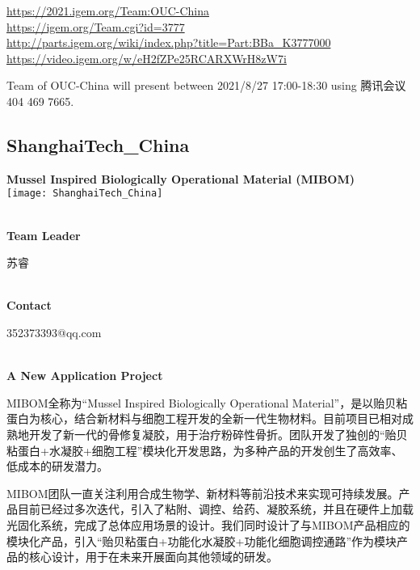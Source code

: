 \url{https://2021.igem.org/Team:OUC-China }\\
\url{https://igem.org/Team.cgi?id=3777 }\\
\url{http://parts.igem.org/wiki/index.php?title=Part:BBa_K3777000 }\\
\url{https://video.igem.org/w/eH2fZPe25RCARXWrH8zW7i }\\

\vfill{}









Team of OUC-China will present between   2021/8/27 17:00-18:30      using 腾讯会议 404 469 7665.
\newpage


\subsection{\textcolor{Blu}{ ShanghaiTech\_China } }
\vspace{5mm}
\begin{center}
\large{
  \textbf{ Mussel Inspired Biologically Operational Material (MIBOM) }\\

  \texttt{[image: ShanghaiTech\_China]}
}
\end{center}
\textbf{\\Team Leader}

  苏睿


\textbf{\\Contact}

  352373393@qq.com


\textbf{\\A New Application Project\\}\begin{spacing}{1.5}

MIBOM全称为“Mussel Inspired Biologically Operational Material”，是以贻贝粘蛋白为核心，结合新材料与细胞工程开发的全新一代生物材料。目前项目已相对成熟地开发了新一代的骨修复凝胶，用于治疗粉碎性骨折。团队开发了独创的“贻贝粘蛋白+水凝胶+细胞工程”模块化开发思路，为多种产品的开发创生了高效率、低成本的研发潜力。

MIBOM团队一直关注利用合成生物学、新材料等前沿技术来实现可持续发展。产品目前已经过多次迭代，引入了粘附、调控、给药、凝胶系统，并且在硬件上加载光固化系统，完成了总体应用场景的设计。我们同时设计了与MIBOM产品相应的模块化产品，引入“贻贝粘蛋白+功能化水凝胶+功能化细胞调控通路”作为模块产品的核心设计，用于在未来开展面向其他领域的研发。\end{spacing}
\\

